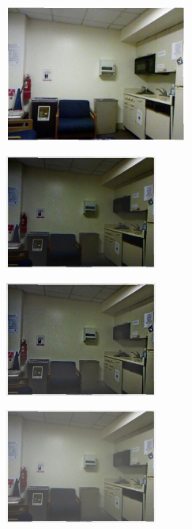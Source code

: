 \begin{figure}[htb]
\begin{subfigure}[b]{1\linewidth}
  \centering
  \centerline{\includegraphics[width=6cm]{hazerd/nyu/ori}}
  \subcaption{}
\end{subfigure}
\vfill
\begin{subfigure}[b]{0.45\linewidth}
  \centering
  \centerline{\includegraphics[width=5cm]{hazerd/nyu/dehaze_he}}
  \subcaption{}
\end{subfigure}
\hfill
\begin{subfigure}[b]{0.45\linewidth}
  \centering
  \centerline{\includegraphics[width=5cm]{hazerd/nyu/dehaze_meng}}
  \subcaption{}
\end{subfigure}
\vfill
\begin{subfigure}[b]{0.45\linewidth}
  \centering
  \centerline{\includegraphics[width=5cm]{hazerd/nyu/dehaze_zhu}}
  \subcaption{}
\end{subfigure}

\end{figure}
